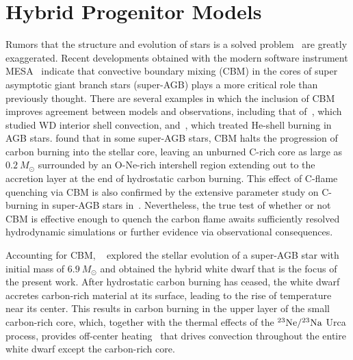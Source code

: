 \documentclass[iop,apj]{emulateapj}
\newcommand{\Ne}[1]{\ensuremath{{}^{#1}{\rm Ne}}}
\newcommand{\Na}[1]{\ensuremath{{}^{#1}{\rm Na}}}
\newcommand{\code}[1]{\textsc{#1}}
\newcommand{\MESA}{\code{MESA}}
\newcommand{\Msun}{\ensuremath{M_\odot}}
\begin{document}
\section{Hybrid Progenitor Models}\label{section:hybrid_progenitor_models}
Rumors that the structure and evolution of stars is a solved
problem~\citep{HansenEtAl04} are greatly exaggerated. Recent
developments obtained with the modern software instrument
\MESA~\citep{mesa1,mesa2,mesa3,mesa3e} indicate that convective boundary
mixing (CBM) in the cores of super asymptotic giant branch stars
(super-AGB) plays a more critical role than previously thought.  There
are several examples in which the inclusion of CBM improves agreement
between models and observations, including that
of~\citet{denissenkovetal2013}, which studied WD interior shell
convection, and~\citet{herwig2005, werner.herwig.2006}, which treated
He-shell burning in AGB stars.
\citet{denissenkovetal2013,chenetal2014} found that in some super-AGB
stars, CBM halts the progression of carbon burning into the stellar
core, leaving an unburned C-rich core as large as $0.2~\Msun$
surrounded by an O-Ne-rich intershell region extending out to the
accretion layer at the end of hydrostatic carbon burning. This effect
of C-flame quenching via CBM is also confirmed by the extensive
parameter study on C-burning in super-AGB stars
in~\citet{farmeretal2015}. Nevertheless, the true test of
  whether or not CBM is effective enough to quench the carbon flame
  awaits sufficiently resolved hydrodynamic simulations or further
  evidence via observational consequences.
  
Accounting for CBM, ~\citet{denissenkovetal2015} explored
the stellar evolution of a super-AGB star with initial mass of
$6.9~\Msun$ and obtained the hybrid white dwarf that is the focus of
the present work. After hydrostatic carbon burning has ceased, the
white dwarf accretes carbon-rich material at its surface, leading to
the rise of temperature near its center. This results in carbon
burning in the upper layer of the small carbon-rich core, which,
together with the thermal effects of the $\Ne{23}/\Na{23}$ Urca process,
provides off-center heating~\citep{denissenkovetal2015} that drives
convection throughout the entire white dwarf except the carbon-rich
core.
\end{document}
